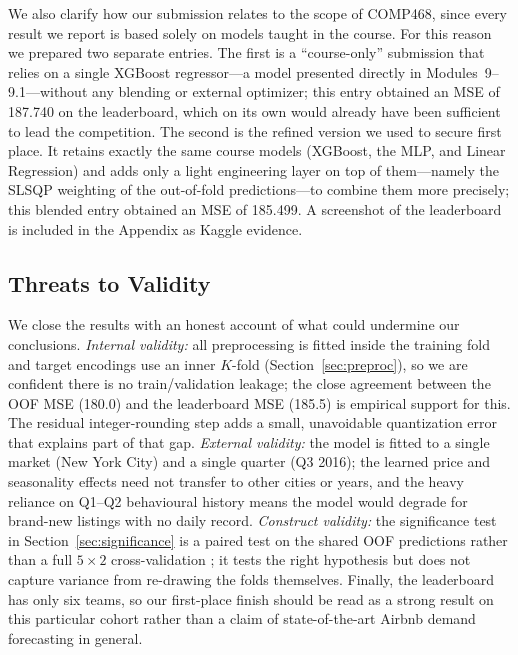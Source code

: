 \documentclass[journal]{IEEEtran}
\begin{document}
We also clarify how our submission relates to the scope of COMP468, since every
result we report is based solely on models taught in the course. For this reason
we prepared two separate entries. The first is a ``course-only'' submission that
relies on a single XGBoost regressor---a model presented directly in
Modules~9--9.1---without any blending or external optimizer; this entry obtained
an MSE of 187.740 on the leaderboard, which on its own would already have been
sufficient to lead the competition. The second is the refined version we used to
secure first place. It retains exactly the same course models (XGBoost, the MLP,
and Linear Regression) and adds only a light engineering layer on top of
them---namely the SLSQP weighting of the out-of-fold predictions---to combine
them more precisely; this blended entry obtained an MSE of 185.499. A screenshot
of the leaderboard is included in the Appendix as Kaggle evidence.

\subsection{Threats to Validity}
\label{sec:threats}
We close the results with an honest account of what could undermine our
conclusions. \emph{Internal validity:} all preprocessing is fitted inside the
training fold and target encodings use an inner $K$-fold (Section~\ref{sec:preproc}),
so we are confident there is no train/validation leakage; the close agreement
between the OOF MSE (180.0) and the leaderboard MSE (185.5) is empirical support
for this. The residual integer-rounding step adds a small, unavoidable
quantization error that explains part of that gap. \emph{External validity:} the
model is fitted to a single market (New York City) and a single quarter (Q3
2016); the learned price and seasonality effects need not transfer to other
cities or years, and the heavy reliance on Q1--Q2 behavioural history means the
model would degrade for brand-new listings with no daily record.
\emph{Construct validity:} the significance test in
Section~\ref{sec:significance} is a paired test on the shared OOF predictions
rather than a full $5\times2$ cross-validation \cite{dietterich1998}; it tests
the right hypothesis but does not capture variance from re-drawing the
folds themselves. Finally, the leaderboard has only six teams, so our first-place
finish should be read as a strong result on this particular cohort rather than a
claim of state-of-the-art Airbnb demand forecasting in general.

\end{document}
